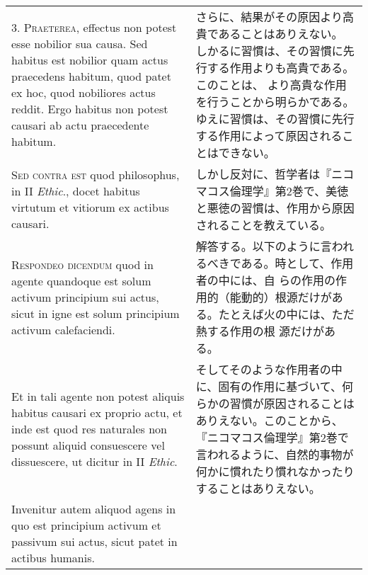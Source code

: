 \documentclass[10pt]{jsarticle} %
\begin{document}
\begin{longtable}{p{21em}p{21em}}
\\




3. {\scshape Praeterea}, effectus non potest esse nobilior sua causa. Sed habitus
 est nobilior quam actus praecedens habitum, quod patet ex hoc, quod
 nobiliores actus reddit. Ergo habitus non potest causari ab actu
 praecedente habitum.

&

さらに、結果がその原因より高貴であることはありえない。
しかるに習慣は、その習慣に先行する作用よりも高貴である。このことは、
より高貴な作用を行うことから明らかである。
ゆえに習慣は、その習慣に先行する作用によって原因されることはできない。

\\




{\scshape Sed contra est} quod philosophus, in II {\itshape Ethic}., docet habitus virtutum
 et vitiorum ex actibus causari.

&

しかし反対に、哲学者は『ニコマコス倫理学』第2巻で、美徳と悪徳の習慣は、作用から原因されることを教えている。

\\




{\scshape Respondeo dicendum} quod in agente quandoque est solum activum
 principium sui actus, sicut in igne est solum principium activum
 calefaciendi. 


&

解答する。以下のように言われるべきである。時として、作用者の中には、自
らの作用の作用的（能動的）根源だけがある。たとえば火の中には、ただ熱する作用の根
源だけがある。

\\


Et in tali agente non potest aliquis habitus causari ex
 proprio actu, et inde est quod res naturales non possunt aliquid
 consuescere vel dissuescere, ut dicitur in II {\itshape Ethic}. 


&

そしてそのような作用者の中に、固有の作用に基づいて、何らかの習慣が原因されることはありえない。このことから、『ニコマコス倫理学』第2巻で言われるように、自然的事物が何かに慣れたり慣れなかったりすることはありえない。

\\


Invenitur autem
 aliquod agens in quo est principium activum et passivum sui actus,
 sicut patet in actibus humanis. 



\end{longtable}
\end{document}

